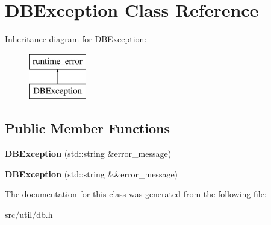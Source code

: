 \hypertarget{class_d_b_exception}{}\section{D\+B\+Exception Class Reference}
\label{class_d_b_exception}
Inheritance diagram for D\+B\+Exception\+:\begin{figure}[H]
\begin{center}
\leavevmode
\includegraphics[height=2.000000cm]{class_d_b_exception}
\end{center}
\end{figure}
\subsection*{Public Member Functions}
\begin{DoxyCompactItemize}
\item 
\mbox{\label{class_d_b_exception_a2257a50d74aa6ad59a80b3ba66cf63a1}} 
{\bfseries D\+B\+Exception} (std\+::string \&error\+\_\+message)
\item 
\mbox{\label{class_d_b_exception_ad599de92924ae243175ca440423c9292}} 
{\bfseries D\+B\+Exception} (std\+::string \&\&error\+\_\+message)
\end{DoxyCompactItemize}


The documentation for this class was generated from the following file\+:\begin{DoxyCompactItemize}
\item 
src/util/db.\+h\end{DoxyCompactItemize}
